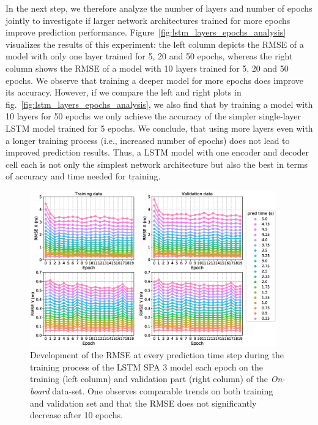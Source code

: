 In the next step, we therefore analyze the number of layers and number of epochs jointly to investigate if larger network architectures trained for more epochs improve prediction performance.
Figure~\ref{fig:lstm_layers_epochs_analysis} visualizes the results of this experiment: the left column depicts the \ac{RMSE} of a model with only one layer trained for \num{5}, \num{20} and \num{50} epochs, whereas the right column shows the \ac{RMSE} of a model with \num{10} layers trained for \num{5}, \num{20} and \num{50} epochs. 
We observe that training a deeper model for more epochs does improve its accuracy.
However, if we compare the left and right plots in fig.~\ref{fig:lstm_layers_epochs_analysis}, we also find that by training a model with \num{10} layers for \num{50} epochs we only achieve the accuracy of the simpler single-layer \ac{LSTM} model trained for \num{5} epochs.
We conclude, that using more layers even with a longer training process (i.e., increased number of epochs) does not lead to improved prediction results.
Thus, a \ac{LSTM} model with one encoder and decoder cell each is not only the simplest network architecture but also the best in terms of accuracy and time needed for training.

\begin{figure}[t!]
  \centering
  \includegraphics[width=0.95\textwidth]{imgs/rmse_dev_over_epochs.eps}
  \caption{Development of the \ac{RMSE} at every prediction time step during the training process of the \ac{LSTM} \acs{SPA} \num{3} model each epoch on the training (left column) and validation part (right column) of the \emph{On-board} data-set.
  One observes comparable trends on both training and validation set and that the \ac{RMSE} does not significantly decrease after \num{10} epochs.}\label{fig:rmse_dev_over_epochs}
\end{figure}


